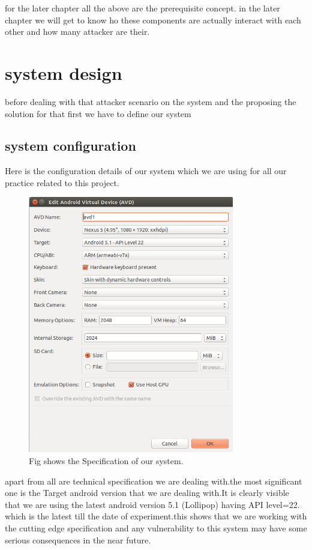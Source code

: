 \documentclass[11pt]{report}
\begin{document}
for the later chapter all the above are the prerequisite concept.
in the later chapter we will get to know ho these components are actually interact with each other and how many attacker are their. 
\chapter{system design}

before dealing with that attacker scenario on the system and the proposing the solution for that first we have to define our system
\section{ system configuration}
Here is the configuration details of our system which we are using for all our practice related to this project.
  \begin{figure}[ht!]
\centering
\includegraphics[width=90mm]{./images/spec.png}
\caption{ Fig shows the Specification of our system. \label{overflow}}
\end{figure}
apart from all are technical specification we are dealing with.the most significant one is the Target android version that we are 
dealing with.It is clearly visible that we are using the latest android version 5.1 (Lollipop) having API level=22.
which is the latest till the date of experiment.this shows that we are working with the cutting edge specification and any vulnerability
to this system may have some serious consequences in the near future.
\end{document}
